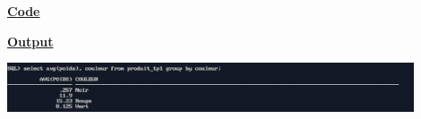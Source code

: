 \newpage
{}

\textbf{\underline{Code}}


\vspace{1cm}
\textbf{\underline{Output}}
\vspace{1cm}
\begin{center}
    \includegraphics[width=0.9\textwidth]{Questions/q31/q31.png}
\end{center}



